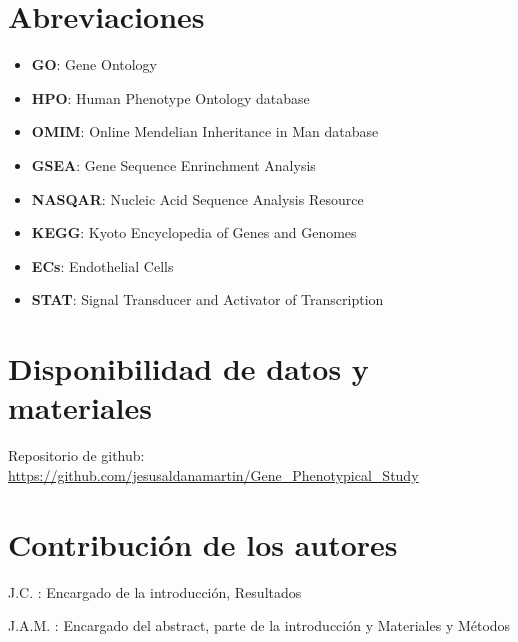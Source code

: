 \documentclass{bmcart}
\begin{document}
	\begin{backmatter}
	
		\section*{Abreviaciones}%
			\begin{itemize}
				\item \label{GO} \textbf{GO}: Gene Ontology 
				\item \label{HPO} \textbf{HPO}: Human Phenotype Ontology database
				\item  \label{OMIM} \textbf{OMIM}: Online Mendelian Inheritance in Man database
				\item \label{GSEA} \textbf{GSEA}: Gene Sequence Enrinchment Analysis
				\item \label{NASQAR} \textbf{NASQAR}: Nucleic Acid Sequence Analysis Resource
				\item \label{KEGG} \textbf{KEGG}: Kyoto Encyclopedia of Genes and Genomes
				\item \label{ECs} \textbf{ECs}: Endothelial Cells
				\item \label{STAT} \textbf{STAT}: Signal Transducer and Activator of Transcription
			\end{itemize}
		
		\section*{Disponibilidad de datos y materiales}%
			Repositorio de github:
			\href{https://github.com/jesusaldanamartin/Gene_Phenotypical_Study}{https://github.com/jesusaldanamartin/Gene\_Phenotypical\_Study}
		
		\section*{Contribución de los autores}
			J.C. : Encargado de la introducción, Resultados 
			
			J.A.M. : Encargado del abstract, parte de la introducción y Materiales y Métodos
		
		
		
	
	\end{backmatter}
\end{document}

